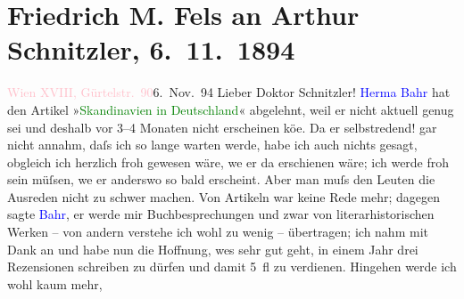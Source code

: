 

               \section[Friedrich M. Fels an Arthur Schnitzler, 6. 11. 1894]{ Friedrich M. Fels an Arthur Schnitzler, 6. 11. 1894}\nopagebreak{}\rehead{ }\normalsize\beginnumbering{} \toendnotes[C]{\smallbreak\pagebreak[2]} 
\toendnotes[C]{\smallbreak}\pstart
           \raggedleft{}{\pb}\textcolor{pink}{Wien XVIII, Gürtelstr. 90}{}\ledrightnote{\textcolor{pink}{Währinger Gürtel}}{\\}6. Nov. 94\pend
           \pstart{}Lieber Doktor Schnitzler!\pend\pstart
           \textcolor{blue}{Herma{\geminationn} Bahr}{}\ledrightnote{\textcolor{blue}{Hermann Bahr}} hat den
               Artikel »\textcolor{green}{Skandinavien in Deutschland}{}\ledrightnote{\textcolor{green}{Skandinavien in Deutschland}}« abgelehnt,
               weil er nicht aktuell genug sei und deshalb vor 3–4 Monaten nicht erscheinen kö{\geminationn}e. Da er selbstredend! gar nicht annahm, daſs ich so
               lange warten werde, habe ich auch nichts gesagt, obgleich ich herzlich froh gewesen
               wäre, we{\geminationn} er da{\geminationn} erschienen
               wäre; ich werde froh sein müſsen, we{\geminationn} er anderswo so
               bald erscheint. Aber man muſs den Leuten \introOben{}die\introOben{} Ausreden nicht
               zu schwer machen. Von Artikeln war keine Rede mehr; dagegen sagte \textcolor{blue}{Bahr}{}\ledrightnote{\textcolor{blue}{Hermann Bahr}}, er werde mir Buchbesprechungen und zwar von
               literarhistorischen Werken – von andern verstehe ich wohl zu wenig – übertragen; ich
               nahm mit Dank an und habe nun die Hoffnung, we{\geminationn}s sehr
               gut geht, in einem Jahr drei Rezensionen schreiben zu dürfen und damit {\pb}5 fl zu verdienen. Hingehen werde ich wohl kaum mehr,
